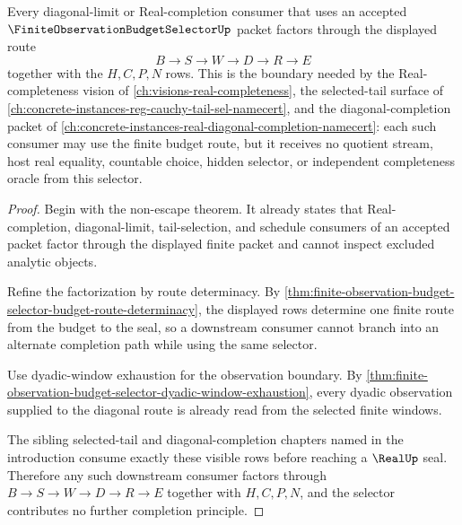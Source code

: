 \begin{theorem}
\label{thm:finite-observation-budget-selector-diagonal-consumer-boundary}
Every diagonal-limit or Real-completion consumer that uses an accepted $\FiniteObservationBudgetSelectorUp$ packet factors through the displayed route
$$
B \to S \to W \to D \to R \to E
$$
together with the $H,C,P,N$ rows. This is the boundary needed by the Real-completeness vision of \autoref{ch:visions-real-completeness}, the selected-tail surface of \autoref{ch:concrete-instances-reg-cauchy-tail-sel-namecert}, and the diagonal-completion packet of \autoref{ch:concrete-instances-real-diagonal-completion-namecert}: each such consumer may use the finite budget route, but it receives no quotient stream, host real equality, countable choice, hidden selector, or independent completeness oracle from this selector.
\end{theorem}
\begin{proof}
Begin with the non-escape theorem. It already states that Real-completion, diagonal-limit, tail-selection, and schedule consumers of an accepted packet factor through the displayed finite packet and cannot inspect excluded analytic objects.

Refine the factorization by route determinacy. By \autoref{thm:finite-observation-budget-selector-budget-route-determinacy}, the displayed rows determine one finite route from the budget to the seal, so a downstream consumer cannot branch into an alternate completion path while using the same selector.

Use dyadic-window exhaustion for the observation boundary. By \autoref{thm:finite-observation-budget-selector-dyadic-window-exhaustion}, every dyadic observation supplied to the diagonal route is already read from the selected finite windows.

The sibling selected-tail and diagonal-completion chapters named in the introduction consume exactly these visible rows before reaching a $\RealUp$ seal. Therefore any such downstream consumer factors through $B \to S \to W \to D \to R \to E$ together with $H,C,P,N$, and the selector contributes no further completion principle.
\end{proof}

